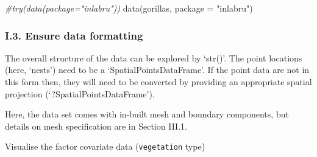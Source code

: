 \documentclass[
]{article}
\newenvironment{Shaded}{\begin{snugshade}}{\end{snugshade}}
\newcommand{\AttributeTok}[1]{\textcolor[rgb]{0.77,0.63,0.00}{#1}}
\newcommand{\CommentTok}[1]{\textcolor[rgb]{0.56,0.35,0.01}{\textit{#1}}}
\newcommand{\FloatTok}[1]{\textcolor[rgb]{0.00,0.00,0.81}{#1}}
\newcommand{\FunctionTok}[1]{\textcolor[rgb]{0.00,0.00,0.00}{#1}}
\newcommand{\NormalTok}[1]{#1}
\newcommand{\OtherTok}[1]{\textcolor[rgb]{0.56,0.35,0.01}{#1}}
\newcommand{\SpecialCharTok}[1]{\textcolor[rgb]{0.00,0.00,0.00}{#1}}
\newcommand{\StringTok}[1]{\textcolor[rgb]{0.31,0.60,0.02}{#1}}
\begin{document}
\begin{Shaded}
\begin{Highlighting}[]
\CommentTok{\#try(data(package="inlabru"))}
\FunctionTok{data}\NormalTok{(gorillas, }\AttributeTok{package =} \StringTok{"inlabru"}\NormalTok{)}
\end{Highlighting}
\end{Shaded}

\hypertarget{i.3.-ensure-data-formatting}{%
\subsubsection{I.3. Ensure data
formatting}\label{i.3.-ensure-data-formatting}}

The overall structure of the data can be explored by `str()'. The point
locations (here, `nests') need to be a `SpatialPointsDataFrame'. If the
point data are not in this form then, they will need to be converted by
providing an appropriate spatial projection (`?SpatialPointsDataFrame').

\begin{Shaded}
\end{Shaded}

Here, the data set comes with in-built mesh and boundary components, but
details on mesh specification are in Section III.1.

\begin{Shaded}
\end{Shaded}

Visualise the factor covariate data (\texttt{vegetation} type)

\begin{Shaded}
\end{Shaded}
\end{document}
